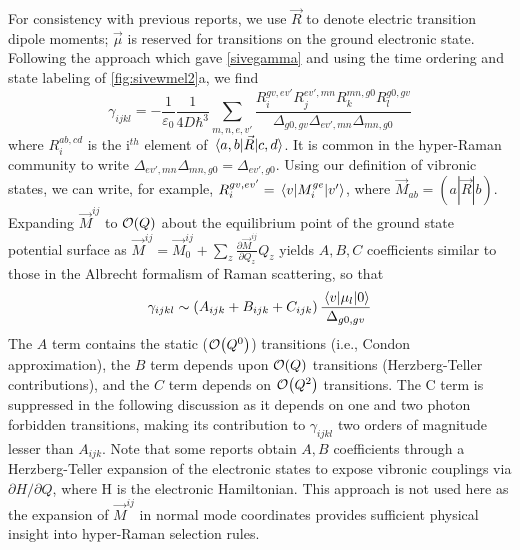 \documentclass[aip, jcp, reprint, onecolumn]{revtex4-2}
\begin{document}
For consistency with previous reports, we use $\vec{R}$ to denote electric transition dipole moments; $\vec{\mu}$ is reserved for transitions on the ground electronic state. \cite{Tang1970}
Following the approach which gave \autoref{sivegamma} and using the time ordering and state labeling of \autoref{fig:sivewmel2}a, we find
\begin{equation}\label{drgamma_notaylor}
	\gamma_{ijkl} = -\frac{1}{\varepsilon_0} \frac{1}{4D \hbar^3} \sum_{m,n,e,v'} \frac{
		R_{i}^{gv, ev'} 
		R_{j}^{ev',mn} 
		R_{k}^{mn,g0} 
		R_{l}^{g0,gv} 
	}{\Delta_{g0,gv}
		\Delta_{ev', mn}
		\Delta_{mn, g0}
	}
\end{equation}
where $R_{i}^{ab,cd}$ is the i$^{th}$ element of $\mel{a,b}{\vec{R}}{c,d}$.
It is common in the hyper-Raman community to write $\Delta_{ev', mn} \Delta_{mn, g0} = \Delta_{ev', g0}$.
Using our definition of vibronic states, we can write, for example,
$R_{i}^{gv,ev'} = \mel{v}{M_i^{ge}}{v'}$, where $\vec{M}_{ab} = (a|\vec{R}|b)$.\cite{Ziegler1974}
Expanding $\vec{M}^{ij}$ to $\order{Q}$ about the equilibrium point of the ground state potential surface as
$\vec{M}^{ij} = \vec{M}^{ij}_0 + \sum_z \frac{\partial\vec{M}^{ij}}{\partial Q_z} Q_z$
yields $A, B, C$ coefficients similar to those in the Albrecht formalism of Raman scattering, \cite{Albrecht1961, Warshel1977, Ziegler1988} so that
\begin{equation}
		\gamma_{ijkl} \sim \left(A_{ijk} + B_{ijk} + C_{ijk}\right) \frac{\mel{v}{\mu_{l}}{0}} {\Delta_{g0,gv}}
\end{equation}
The $A$ term contains the static ($\order{Q^0}$) transitions (i.e., Condon approximation), the $B$ term depends upon $\order{Q}$ transitions (Herzberg-Teller contributions), and the $C$ term depends on $\order{Q^2}$ transitions. 
The C term is suppressed in the following discussion as it depends on one and two photon forbidden transitions, making its contribution to $\gamma_{ijkl}$ two orders of magnitude lesser than $A_{ijk}$. \cite{Ziegler1988, Neddersen1989, Bonang1992}
Note that some reports obtain $A, B$ coefficients through a Herzberg-Teller expansion of the electronic states to expose vibronic couplings via $\partial H / \partial Q$, where H is the electronic Hamiltonian.\cite{HerzbergTeller1933, Petrov1985, Neddersen1989, Baranov1990}
This approach is not used here as the expansion of $\vec{M}^{ij}$ in normal mode coordinates provides sufficient physical insight into hyper-Raman selection rules. 
\end{document}
